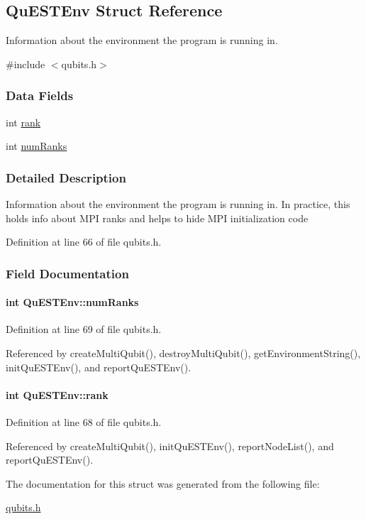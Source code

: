 \hypertarget{structQuESTEnv}{
\subsection{QuESTEnv Struct Reference}
\label{structQuESTEnv}
}


Information about the environment the program is running in.  


{\ttfamily \#include $<$qubits.h$>$}\subsubsection*{Data Fields}
\begin{DoxyCompactItemize}
\item 
int \hyperlink{structQuESTEnv_aa648bb336cf8598467cb62db00b9cee8}{rank}
\item 
int \hyperlink{structQuESTEnv_af22aacd7c9905accae28484785c193b4}{numRanks}
\end{DoxyCompactItemize}


\subsubsection{Detailed Description}
Information about the environment the program is running in. In practice, this holds info about MPI ranks and helps to hide MPI initialization code 

Definition at line 66 of file qubits.h.

\subsubsection{Field Documentation}
\hypertarget{structQuESTEnv_af22aacd7c9905accae28484785c193b4}{
\paragraph[{numRanks}]{\setlength{\rightskip}{0pt plus 5cm}int {\bf QuESTEnv::numRanks}}\hfill}
\label{structQuESTEnv_af22aacd7c9905accae28484785c193b4}


Definition at line 69 of file qubits.h.

Referenced by createMultiQubit(), destroyMultiQubit(), getEnvironmentString(), initQuESTEnv(), and reportQuESTEnv().\hypertarget{structQuESTEnv_aa648bb336cf8598467cb62db00b9cee8}{
\paragraph[{rank}]{\setlength{\rightskip}{0pt plus 5cm}int {\bf QuESTEnv::rank}}\hfill}
\label{structQuESTEnv_aa648bb336cf8598467cb62db00b9cee8}


Definition at line 68 of file qubits.h.

Referenced by createMultiQubit(), initQuESTEnv(), reportNodeList(), and reportQuESTEnv().

The documentation for this struct was generated from the following file:\begin{DoxyCompactItemize}
\item 
\hyperlink{qubits_8h}{qubits.h}\end{DoxyCompactItemize}
